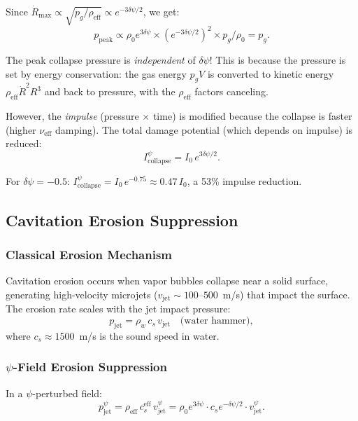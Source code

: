 \documentclass[12pt,twocolumn]{article}
\newcommand{\Reff}{\mathrm{eff}}
\newcommand{\dpsi}{\delta\psi}
\begin{document}
Since $\dot{R}_\mathrm{max} \propto \sqrt{p_g/\rho_\Reff} \propto
e^{-3\dpsi/2}$, we get:
\begin{equation}
p_\mathrm{peak} \propto \rho_0 e^{3\dpsi}\times(e^{-3\dpsi/2})^2
\times p_g/\rho_0 = p_g.
\end{equation}

The peak collapse pressure is \emph{independent} of $\dpsi$! This is
because the pressure is set by energy conservation: the gas energy $p_g V$
is converted to kinetic energy $\rho_\Reff \dot{R}^2 R^3$ and back to
pressure, with the $\rho_\Reff$ factors canceling.

However, the \emph{impulse} (pressure $\times$ time) is modified because
the collapse is faster (higher $\nu_\Reff$ damping). The total damage
potential (which depends on impulse) is reduced:
\begin{equation}
I_\mathrm{collapse}^\psi = I_0\,e^{3\dpsi/2}.
\end{equation}

For $\dpsi = -0.5$: $I_\mathrm{collapse}^\psi = I_0\,e^{-0.75} \approx
0.47\,I_0$, a 53\% impulse reduction.

\subsection{Cavitation Erosion Suppression}
\label{sec:cavitation_erosion}

\subsubsection{Classical Erosion Mechanism}

Cavitation erosion occurs when vapor bubbles collapse near a solid surface,
generating high-velocity microjets ($v_\mathrm{jet} \sim 100$--$500$~m/s)
that impact the surface. The erosion rate scales with the jet impact
pressure:
\begin{equation}
p_\mathrm{jet} = \rho_w\,c_s\,v_\mathrm{jet}\quad\text{(water hammer)},
\end{equation}
where $c_s \approx 1500$~m/s is the sound speed in water.

\subsubsection{$\psi$-Field Erosion Suppression}

In a $\psi$-perturbed field:
\begin{equation}
p_\mathrm{jet}^\psi = \rho_\Reff\,c_s^\Reff\,v_\mathrm{jet}^\psi
= \rho_0 e^{3\dpsi}\cdot c_s e^{-\dpsi/2}\cdot v_\mathrm{jet}^\psi.
\end{equation}
\end{document}
